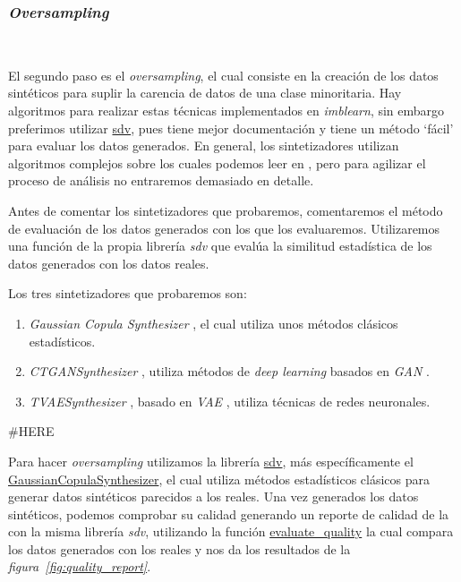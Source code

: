\subsubsection{\textit{Oversampling}}\ \label{sec:oversampling}

El segundo paso es el \textit{oversampling}, el cual consiste en la creación de los datos sintéticos para suplir la carencia de datos de una clase minoritaria. Hay algoritmos para realizar estas técnicas implementados en \textit{imblearn}, sin embargo preferimos utilizar \href{https://sdv.dev/}{sdv}, pues tiene mejor documentación y tiene un método `fácil' para evaluar los datos generados. \cite{Synthesi69:online} En general, los sintetizadores utilizan algoritmos complejos sobre los cuales podemos leer en \cite{Synthesi69:online}, pero para agilizar el proceso de análisis no entraremos demasiado en detalle.

Antes de comentar los sintetizadores que probaremos, comentaremos el método de evaluación de los datos generados con los que los evaluaremos. Utilizaremos una función de la propia librería \textit{sdv} que evalúa la similitud estadística de los datos generados con los datos reales.

Los tres sintetizadores que probaremos son:

\begin{enumerate}
    \item \textit{Gaussian Copula Synthesizer} \cite{Gaussian4:online}, el cual utiliza unos métodos clásicos estadísticos.
    \item \textit{CTGANSynthesizer} \cite{CTGANSyn50:online}, utiliza métodos de \textit{deep learning} basados en \textit{GAN} \cite{Generati72:online}.
    \item \textit{TVAESynthesizer} \cite{TVAESynt0:online}, basado en \textit{VAE} \cite{Variatio61:online}, utiliza técnicas de redes neuronales.
\end{enumerate}

#HERE

Para hacer \textit{oversampling} utilizamos la librería \href{https://sdv.dev/}{sdv}, más específicamente el \href{https://docs.sdv.dev/sdv/single-table-data/modeling/synthesizers/gaussiancopulasynthesizer}{GaussianCopulaSynthesizer}, el cual utiliza métodos estadísticos clásicos para generar datos sintéticos parecidos a los reales. Una vez generados los datos sintéticos, podemos comprobar su calidad generando un reporte de calidad de la con la misma librería \textit{sdv}, utilizando la función \href{https://docs.sdv.dev/sdv/single-table-data/evaluation#evaluate_quality}{evaluate\_quality} la cual compara los datos generados con los reales y nos da los resultados de la \textit{figura\ \ref{fig:quality_report}}.

